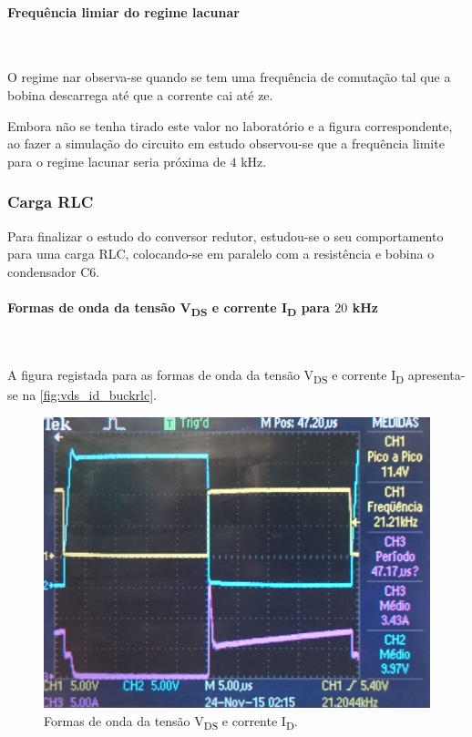 \documentclass[a4paper,11pt]{article}
\numberwithin{equation}{section}
\begin{document}
\paragraph{Frequência limiar do regime lacunar}\mbox{}\

O regime nar observa-se quando se tem uma frequência de comutação tal que a bobina descarrega até que a corrente cai até ze.

Embora não se tenha tirado este valor no laboratório e a figura correspondente, ao fazer a simulação do circuito em estudo observou-se que a frequência limite para o regime lacunar seria próxima de $4$ kHz.

\subsubsection{Carga RLC}

Para finalizar o estudo do conversor redutor, estudou-se o seu comportamento para uma carga RLC, colocando-se em paralelo com a resistência e bobina o condensador C6.

\paragraph{Formas de onda da tensão V\textsubscript{DS} e corrente I\textsubscript{D} para $20$ kHz}\mbox{}\


A figura registada para as formas de onda da tensão V\textsubscript{DS} e corrente I\textsubscript{D} apresenta-se na \autoref{fig:vds_id_buckrlc}.

\begin{figure}[H]
	\centering
	\includegraphics[keepaspectratio=true, scale=0.17]{img/figs/vds_id_buckrlc}
	\caption{Formas de onda da tensão V\textsubscript{DS} e corrente I\textsubscript{D}.}
	\label{fig:vds_id_buckrlc}
	\vspace{-0.8em}
\end{figure} 
\end{document}
